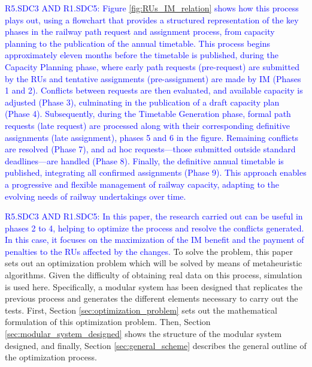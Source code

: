 \documentclass[Afour,sagev,times]{sagej}
\newcommand{\quinto}[1]{\textcolor{blue}{#1}}
\begin{document}
\quinto{R5.SDC3 AND R1.SDC5: Figure \ref{fig:RUs_IM_relation} shows how this process plays out, using a flowchart that provides a structured representation of the key phases in the railway path request and assignment process, from capacity planning to the publication of the annual timetable. This process begins approximately eleven months before the timetable is published, during the Capacity Planning phase, where early path requests (pre-request) are submitted by the RUs and tentative assignments (pre-assignment) are made by \gls{IM} (Phases 1 and 2). Conflicts between requests are then evaluated, and available capacity is adjusted (Phase 3), culminating in the publication of a draft capacity plan (Phase 4). Subsequently, during the Timetable Generation phase, formal path requests (late request) are processed along with their corresponding definitive assignments (late assignment), phases 5 and 6 in the figure. Remaining conflicts are resolved (Phase 7), and ad hoc requests—those submitted outside standard deadlines—are handled (Phase 8). Finally, the definitive annual timetable is published, integrating all confirmed assignments (Phase 9). This approach enables a progressive and flexible management of railway capacity, adapting to the evolving needs of railway undertakings over time. }


\quinto{R5.SDC3 AND R1.SDC5: In this paper, the research carried out can be useful in phases 2 to 4, helping to optimize the process and resolve the conflicts generated. In this case, it focuses on the maximization of the \gls{IM} benefit and the payment of penalties to the \glspl{RU} affected by the changes.} To solve the problem, this paper sets out an optimization problem which will be solved by means of metaheuristic algorithms. Given the difficulty of obtaining real data on this process, simulation is used here. Specifically, a modular system has been designed that replicates the previous process and generates the different elements necessary to carry out the tests. First, Section \ref{sec:optimization_problem} sets out the mathematical formulation of this optimization problem. Then, Section \ref{sec:modular_system_designed} shows the structure of the modular system designed, and finally, Section \ref{sec:general_scheme} describes the general outline of the optimization process. 
\end{document}
